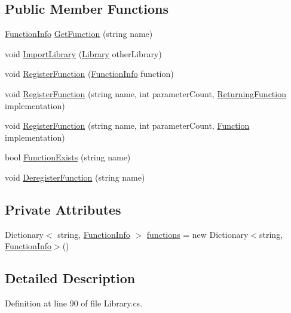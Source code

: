 \subsection*{Public Member Functions}
\begin{DoxyCompactItemize}
\item 
\hyperlink{a00103}{Function\-Info} \hyperlink{a00123_aacfb1f00ad8aa3921941b8d8af0960e0}{Get\-Function} (string name)
\item 
void \hyperlink{a00123_ab42a4fd30a72156cafa685f959deef78}{Import\-Library} (\hyperlink{a00123}{Library} other\-Library)
\item 
void \hyperlink{a00123_a001ab29d21fe7db10fc9c250914287f9}{Register\-Function} (\hyperlink{a00103}{Function\-Info} function)
\item 
void \hyperlink{a00123_a2a698de0b528b2bac17bd85f57d45d4b}{Register\-Function} (string name, int parameter\-Count, \hyperlink{a00050_a5177bf74fbfe7303fac9d8236c2e514b}{Returning\-Function} implementation)
\item 
void \hyperlink{a00123_a6820eaa082077f16496effbc9041b7ad}{Register\-Function} (string name, int parameter\-Count, \hyperlink{a00050_ae0be2e5cf13d5779816102439e61ff1a}{Function} implementation)
\item 
bool \hyperlink{a00123_a6c9a1cc3e25b6aae25e210d8a0d68c09}{Function\-Exists} (string name)
\item 
void \hyperlink{a00123_a47d1b3664733207d5cda15f4a4a7af7a}{Deregister\-Function} (string name)
\end{DoxyCompactItemize}
\subsection*{Private Attributes}
\begin{DoxyCompactItemize}
\item 
Dictionary$<$ string, \hyperlink{a00103}{Function\-Info} $>$ \hyperlink{a00123_a2fcc78a63963be5320cf09783b66fab6}{functions} = new Dictionary$<$string, \hyperlink{a00103}{Function\-Info}$>$()
\end{DoxyCompactItemize}


\subsection{Detailed Description}


Definition at line 90 of file Library.\-cs.



